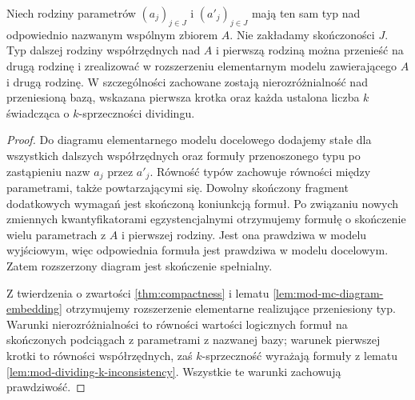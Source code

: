\begin{lemat}
\label{lem:mod-transfer-parameter-family}
Niech rodziny parametrów $(a_j)_{j\in J}$
i $(a'_j)_{j\in J}$ mają ten sam typ
nad odpowiednio nazwanym wspólnym zbiorem $A$.
Nie zakładamy skończoności $J$.
Typ dalszej rodziny współrzędnych nad $A$
i pierwszą rodziną można przenieść na drugą
rodzinę i zrealizować w rozszerzeniu elementarnym
modelu zawierającego $A$ i drugą rodzinę.
W szczególności zachowane zostają
nierozróżnialność nad przeniesioną bazą,
wskazana pierwsza krotka oraz każda
ustalona liczba $k$ świadcząca
o $k$-sprzeczności dividingu.
\end{lemat}
\begin{proof}
Do diagramu elementarnego modelu docelowego
dodajemy stałe dla wszystkich dalszych
współrzędnych oraz formuły przenoszonego
typu po zastąpieniu nazw $a_j$ przez $a'_j$.
Równość typów zachowuje równości między
parametrami, także powtarzającymi się.
Dowolny skończony fragment dodatkowych wymagań
jest skończoną koniunkcją formuł.
Po związaniu nowych zmiennych kwantyfikatorami
egzystencjalnymi otrzymujemy formułę
o skończenie wielu parametrach z $A$
i pierwszej rodziny. Jest ona prawdziwa
w modelu wyjściowym, więc odpowiednia formuła
jest prawdziwa w modelu docelowym.
Zatem rozszerzony diagram jest skończenie
spełnialny.

Z twierdzenia o zwartości \ref{thm:compactness}
i lematu \ref{lem:mod-mc-diagram-embedding}
otrzymujemy rozszerzenie elementarne
realizujące przeniesiony typ.
Warunki nierozróżnialności to równości
wartości logicznych formuł na skończonych
podciągach z parametrami z nazwanej bazy;
warunek pierwszej krotki to równości
współrzędnych, zaś $k$-sprzeczność wyrażają
formuły z lematu
\ref{lem:mod-dividing-k-inconsistency}.
Wszystkie te warunki zachowują prawdziwość.
\end{proof}

